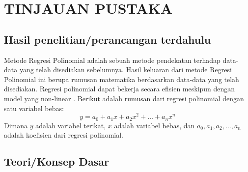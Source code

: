 \chapter{TINJAUAN PUSTAKA}
\label{chap:tinjauanpustaka}

\section{Hasil penelitian/perancangan terdahulu}
Metode Regresi Polinomial adalah sebuah metode pendekatan terhadap data-data yang telah disediakan sebelumnya. Hasil keluaran dari metode Regresi Polinomial ini berupa rumusan matematika berdasarkan data-data yang telah disediakan. Regresi polinomial dapat bekerja secara efisien meskipun dengan model yang non-linear 
\parencite{ref_regresi}. Berikut adalah rumusan dari regresi polinomial dengan satu variabel bebas: 
\begin{equation}
  y = a_0 + a_1x + a_2x^2 + \ldots + a_nx^n
\end{equation}
Dimana \(y\) adalah variabel terikat, \(x\) adalah variabel bebas, dan \(a_0, a_1, a_2, \ldots, a_n\) adalah koefisien dari regresi polinomial.

\section{Teori/Konsep Dasar}

